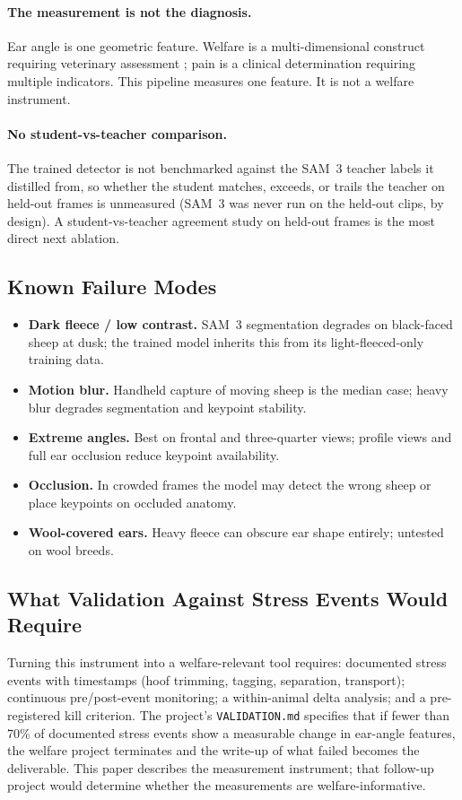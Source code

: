 \documentclass[11pt]{article}
\begin{document}
\paragraph{The measurement is not the diagnosis.} Ear angle is one geometric
feature. Welfare is a multi-dimensional construct requiring veterinary
assessment \citep{berckmans2014precision}; pain is a clinical determination
requiring multiple indicators. This pipeline measures one feature. It is not a
welfare instrument.

\paragraph{No student-vs-teacher comparison.} The trained detector is not
benchmarked against the SAM~3 teacher labels it distilled from, so whether the
student matches, exceeds, or trails the teacher on held-out frames is unmeasured
(SAM~3 was never run on the held-out clips, by design). A student-vs-teacher
agreement study on held-out frames is the most direct next ablation.

\subsection{Known Failure Modes}
\begin{itemize}
  \item \textbf{Dark fleece / low contrast.} SAM~3 segmentation degrades on
  black-faced sheep at dusk; the trained model inherits this from its
  light-fleeced-only training data.
  \item \textbf{Motion blur.} Handheld capture of moving sheep is the median
  case; heavy blur degrades segmentation and keypoint stability.
  \item \textbf{Extreme angles.} Best on frontal and three-quarter views;
  profile views and full ear occlusion reduce keypoint availability.
  \item \textbf{Occlusion.} In crowded frames the model may detect the wrong
  sheep or place keypoints on occluded anatomy.
  \item \textbf{Wool-covered ears.} Heavy fleece can obscure ear shape entirely;
  untested on wool breeds.
\end{itemize}

\subsection{What Validation Against Stress Events Would Require}
Turning this instrument into a welfare-relevant tool requires: documented stress
events with timestamps (hoof trimming, tagging, separation, transport);
continuous pre/post-event monitoring; a within-animal delta analysis; and a
pre-registered kill criterion. The project's \texttt{VALIDATION.md} specifies
that if fewer than 70\% of documented stress events show a measurable change in
ear-angle features, the welfare project terminates and the write-up of what
failed becomes the deliverable. This paper describes the measurement instrument;
that follow-up project would determine whether the measurements are
welfare-informative.
\end{document}
